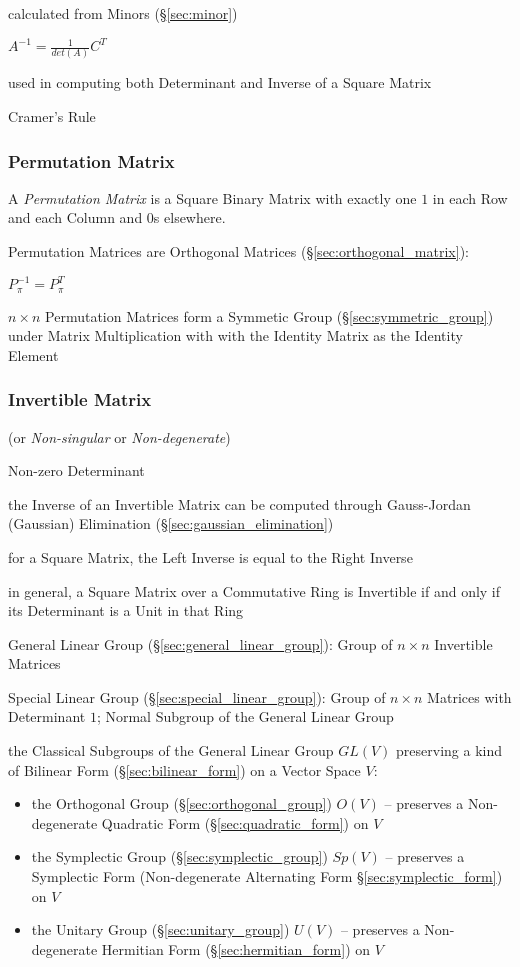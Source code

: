 calculated from Minors (\S\ref{sec:minor})

$A^{-1} = \frac{1}{det(A)}C^T$

used in computing both Determinant and Inverse of a Square Matrix

Cramer's Rule



\subsubsection{Permutation Matrix}\label{sec:permutation_matrix}

A \emph{Permutation Matrix} is a Square Binary Matrix with exactly one
$1$ in each Row and each Column and $0$s elsewhere.

Permutation Matrices are Orthogonal Matrices (\S\ref{sec:orthogonal_matrix}):

$P_\pi^{-1} = P_\pi^T$

$n \times n$ Permutation Matrices form a Symmetic Group
(\S\ref{sec:symmetric_group}) under Matrix Multiplication with
with the Identity Matrix as the Identity Element



\subsubsection{Invertible Matrix}\label{sec:invertible_matrix}

(or \emph{Non-singular} or \emph{Non-degenerate})

Non-zero Determinant

\fist the Inverse of an Invertible Matrix can be computed through Gauss-Jordan
(Gaussian) Elimination (\S\ref{sec:gaussian_elimination})

for a Square Matrix, the Left Inverse is equal to the Right Inverse

in general, a Square Matrix over a Commutative Ring is Invertible if and only
if its Determinant is a Unit in that Ring

\fist General Linear Group (\S\ref{sec:general_linear_group}): Group of $n
\times n$ Invertible Matrices

\fist Special Linear Group (\S\ref{sec:special_linear_group}): Group of $n
\times n$ Matrices with Determinant $1$; Normal Subgroup of the General Linear
Group

the Classical Subgroups of the General Linear Group $GL(V)$ preserving a kind
of Bilinear Form (\S\ref{sec:bilinear_form}) on a Vector Space $V$:
\begin{itemize}
  \item the Orthogonal Group (\S\ref{sec:orthogonal_group}) $O(V)$ -- preserves
    a Non-degenerate Quadratic Form (\S\ref{sec:quadratic_form}) on $V$
  \item the Symplectic Group (\S\ref{sec:symplectic_group}) $Sp(V)$
    -- preserves a Symplectic Form (Non-degenerate Alternating Form
    \S\ref{sec:symplectic_form}) on $V$
  \item the Unitary Group (\S\ref{sec:unitary_group}) $U(V)$
    -- preserves a Non-degenerate Hermitian Form (\S\ref{sec:hermitian_form})
    on $V$
\end{itemize}

